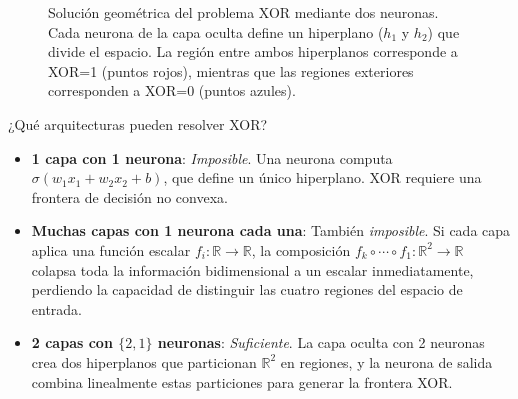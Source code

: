 \begin{figure}[h]
\centering
{}
\caption[Solución geométrica del problema XOR]{Solución geométrica del problema XOR mediante dos neuronas. Cada neurona de la capa oculta define un hiperplano ($h_1$ y $h_2$) que divide el espacio. La región entre ambos hiperplanos corresponde a XOR=1 (puntos rojos), mientras que las regiones exteriores corresponden a XOR=0 (puntos azules).}
\label{fig:xor_geometrico}
\end{figure}

¿Qué arquitecturas pueden resolver XOR?
\begin{itemize}
    \item \textbf{1 capa con 1 neurona}: \textit{Imposible}. Una neurona computa $\sigma(w_1 x_1 + w_2 x_2 + b)$, que define un único hiperplano. XOR requiere una frontera de decisión no convexa.

    \item \textbf{Muchas capas con 1 neurona cada una}: También \textit{imposible}. Si cada capa aplica una función escalar $f_i: \mathbb{R} \to \mathbb{R}$, la composición $f_k \circ \cdots \circ f_1: \mathbb{R}^2 \to \mathbb{R}$ colapsa toda la información bidimensional a un escalar inmediatamente, perdiendo la capacidad de distinguir las cuatro regiones del espacio de entrada.

    \item \textbf{2 capas con $\{2, 1\}$ neuronas}: \textit{Suficiente}. La capa oculta con 2 neuronas crea dos hiperplanos que particionan $\mathbb{R}^2$ en regiones, y la neurona de salida combina linealmente estas particiones para generar la frontera XOR.
\end{itemize}

